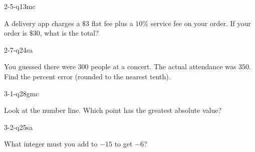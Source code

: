 \begin{practiceQuestion}{2-5-q13}{mc}
\begin{questionText}
A delivery app charges a $\$3$ flat fee plus a $10\%$ service fee on your order. If your order is $\$30$, what is the total?


\end{questionText}
\end{practiceQuestion}

\begin{practiceQuestion}{2-7-q24}{sa}
\begin{questionText}
You guessed there were $300$ people at a concert. The actual attendance was $350$. Find the percent error (rounded to the nearest tenth).
\end{questionText}
\end{practiceQuestion}

\begin{practiceQuestion}{3-1-q28}{gmc}
\begin{questionText}
Look at the number line. Which point has the greatest absolute value?

\begin{center}
\end{center}
\end{questionText}
\end{practiceQuestion}

\begin{practiceQuestion}{3-2-q25}{sa}
\begin{questionText}
What integer must you add to $-15$ to get $-6$?
\end{questionText}
\end{practiceQuestion}

